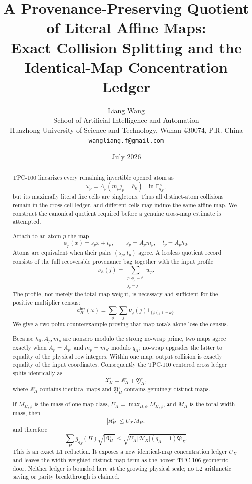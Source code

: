 \documentclass[11pt]{article}
\title{\textbf{A Provenance-Preserving Quotient}\\
\textbf{of Literal Affine Maps:}\\
Exact Collision Splitting and the Identical-Map Concentration Ledger}
\author{Liang Wang\\
School of Artificial Intelligence and Automation\\
Huazhong University of Science and Technology, Wuhan 430074, P.R. China\\
\texttt{wangliang.f@gmail.com}}
\date{July 2026}
\theoremstyle{definition}
\theoremstyle{remark}
\newcommand{\one}{\mathbf 1}
\newcommand{\Lone}{\mathrm{L1}}
\newcommand{\Ltwo}{\mathrm{L2}}
\begin{document}
\maketitle

\begin{abstract}
TPC-100 linearizes every remaining invertible opened atom as
\[
 \omega_p=A_p(m_pj_p+h_0)
 \quad\text{in }\mathbb F_{q_X}^{\times},
\]
but its maximally literal fine cells are singletons.  Thus all
distinct-atom collisions remain in the cross-cell ledger, and
different cells may induce the same affine map.  We construct the
canonical quotient required before a genuine cross-map estimate is
attempted.

Attach to an atom \(p\) the map
\[
 \phi_p(x)=s_px+t_p,\qquad
 s_p=A_pm_p,\quad t_p=A_ph_0.
\]
Atoms are equivalent when their pairs \((s_p,t_p)\) agree.  A
lossless quotient record consists of the full recoverable
provenance bag together with the input profile
\[
 \nu_\phi(j)=
 \sum_{\substack{p:\phi_p=\phi\\j_p=j}}w_p.
\]
The profile, not merely the total map weight, is necessary and
sufficient for the positive multiplier census:
\[
 a_H^{\mathrm{inv}}(\omega)
 =
 \sum_\phi\sum_j
 \nu_\phi(j)\one_{\{\phi(j)=\omega\}}.
\]
We give a two-point counterexample proving that map totals alone
lose the census.

Because \(h_0,A_p,m_p\) are nonzero modulo the strong no-wrap prime,
two maps agree exactly when \(A_p=A_{p'}\) and
\(m_p=m_{p'}\) modulo \(q_X\); no-wrap upgrades the latter to
equality of the physical row integers.  Within one map, output
collision is exactly equality of the input coordinates.
Consequently the TPC-100 centered cross ledger splits identically as
\[
 \mathfrak X_H^\circ
 =
 \mathfrak K_H^\circ+\mathfrak Y_H^\circ,
\]
where \(\mathfrak K_H^\circ\) contains identical maps and
\(\mathfrak Y_H^\circ\) contains genuinely distinct maps.

If \(M_{H,\phi}\) is the mass of one map class,
\(U_X=\max_{H,\phi}M_{H,\phi}\), and \(M_H\) is the total width
mass, then
\[
 |\mathfrak K_H^\circ|\le U_XM_H,
\]
and therefore
\[
 \sum_Hg_{q_X}(H)\sqrt{|\mathfrak K_H^\circ|}
 \le
 \sqrt{U_X|\mathcal H_X|(q_X-1)\mathfrak P_X}.
\]
This is an exact \(\Lone\) reduction.  It exposes a new
identical-map concentration ledger \(U_X\) and leaves the
width-weighted distinct-map term as the honest TPC-106 geometric
door.  Neither ledger is bounded here at the growing physical
scale; no \(\Ltwo\) arithmetic saving or parity breakthrough is
claimed.
\end{abstract}
\end{document}
